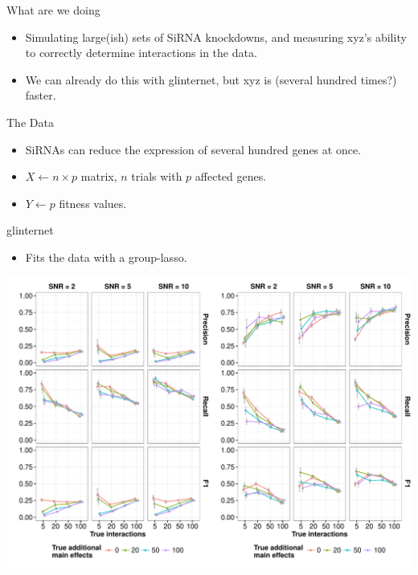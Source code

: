 \begin{frame}{What are we doing}
\begin{itemize}
	\item Simulating large(ish) sets of SiRNA knockdowns, and measuring xyz's ability to correctly determine interactions in the data.
	\item We can already do this with glinternet, but xyz is (several hundred times?) faster.
\end{itemize}
\end{frame}

\begin{frame}{The Data}
\begin{itemize}
	\item SiRNAs can reduce the expression of several hundred genes at once.
	\item $X \leftarrow n \times p$ matrix, $n$ trials with $p$ affected genes.
	\item $Y \leftarrow p$ fitness values.
\end{itemize}
\end{frame}

\begin{frame}{glinternet}
\centering
	\begin{itemize}
		\item Fits the data with a group-lasso.
	\end{itemize}
	\begin{minipage}{0.8\linewidth}
		\centering
		\includegraphics[width=\linewidth]{"PrecRecF1/glinternet_figure"}
	\end{minipage}
\end{frame}

